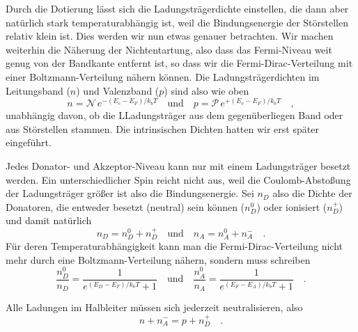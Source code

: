 Durch die Dotierung lässt sich die Ladungsträgerdichte einstellen, die dann aber natürlich stark temperaturabhängig ist, weil die Bindungsenergie der Störstellen relativ klein ist. Dies werden wir nun etwas genauer betrachten. Wir machen weiterhin die Näherung der Nichtentartung, also dass das Fermi-Niveau weit genug von der Bandkante entfernt ist, so dass wir die Fermi-Dirac-Verteilung mit einer Boltzmann-Verteilung nähern können. Die Ladungsträgerdichten im Leitungsband ($n$) und Valenzband ($p$) sind also wie oben
\begin{equation}
    n  = \mathcal{N} \, e^{- (E_c - E_F) / k_b T} \quad \text{und} \quad   
    p =  \mathcal{P} \, e^{+ (E_v - E_F) / k_b T} \quad , \label{eq:5_np_eff}
\end{equation}
unabhängig davon, ob die LLadungsträger aus dem gegenüberliegen Band oder aus Störstellen stammen. Die intrinsischen Dichten hatten wir erst später eingeführt.

Jedes Donator- und Akzeptor-Niveau kann nur mit einem Ladungsträger besetzt werden. Ein unterschiedlicher Spin reicht nicht aus, weil die Coulomb-Abstoßung der Ladungsträger größer ist also die Bindungsenergie. Sei $n_D$ also die Dichte der Donatoren, die entweder besetzt (neutral) sein können ($n_D^0$) oder ionisiert  ($n_D^+$) und damit natürlich
\begin{equation}
    n_D = n_D^0 + n_D^+ \quad \text{und} \quad   n_A = n_A^0 + n_A^-   \quad .
\end{equation}
Für deren Temperaturabhängigkeit kann man die Fermi-Dirac-Verteilung nicht mehr durch eine Boltzmann-Verteilung nähern, sondern muss schreiben
\begin{equation}
    \frac{n_D^0}{n_D} = \frac{1}{e^{(E_D - E_F)/ k_b T } +1}
    \quad \text{und} \quad 
    \frac{n_A^0}{n_A} = \frac{1}{e^{(E_F - E_A)/ k_b T } +1} \quad .
\end{equation}

Alle Ladungen im Halbleiter müssen sich jederzeit neutralisieren, also 
\begin{equation}
    n + n_A^- = p + n_D^+ \quad .
\end{equation}

